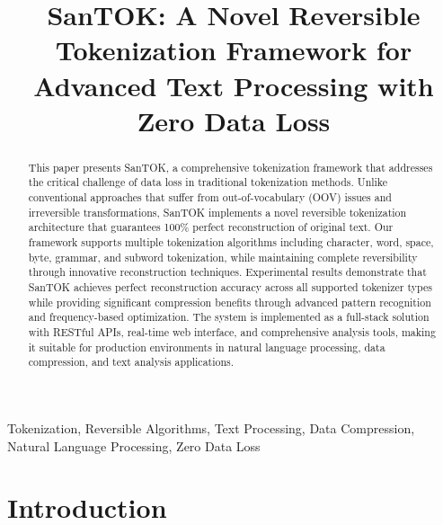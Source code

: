 \documentclass[conference]{IEEEtran}
\begin{document}
\title{SanTOK: A Novel Reversible Tokenization Framework for Advanced Text Processing with Zero Data Loss}

\author{
\and
{}
}

\maketitle

\begin{abstract}
This paper presents SanTOK, a comprehensive tokenization framework that addresses the critical challenge of data loss in traditional tokenization methods. Unlike conventional approaches that suffer from out-of-vocabulary (OOV) issues and irreversible transformations, SanTOK implements a novel reversible tokenization architecture that guarantees 100\% perfect reconstruction of original text. Our framework supports multiple tokenization algorithms including character, word, space, byte, grammar, and subword tokenization, while maintaining complete reversibility through innovative reconstruction techniques. Experimental results demonstrate that SanTOK achieves perfect reconstruction accuracy across all supported tokenizer types while providing significant compression benefits through advanced pattern recognition and frequency-based optimization. The system is implemented as a full-stack solution with RESTful APIs, real-time web interface, and comprehensive analysis tools, making it suitable for production environments in natural language processing, data compression, and text analysis applications.
\end{abstract}

\begin{IEEEkeywords}
Tokenization, Reversible Algorithms, Text Processing, Data Compression, Natural Language Processing, Zero Data Loss
\end{IEEEkeywords}

\section{Introduction}
\end{document}
